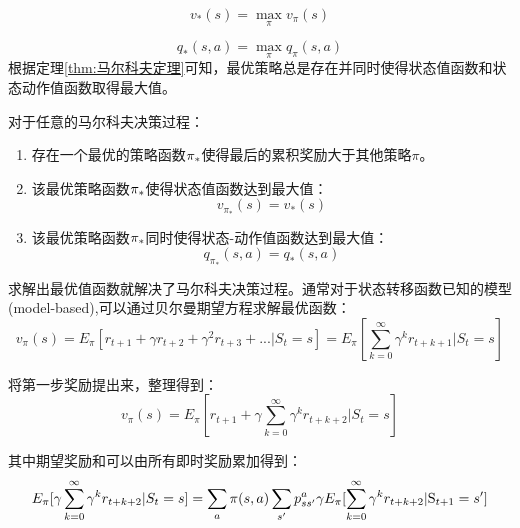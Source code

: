 \begin{equation}
\label{eq:6}
{v_*}(s) = \mathop {\max }\limits_\pi  {v_\pi }(s)
\end{equation}

\begin{equation}
\label{eq:7}
{q_*}(s,a) = \mathop {\max }\limits_\pi  {q_\pi }(s,a)
\end{equation}
根据定理\ref{thm:马尔科夫定理}可知，最优策略总是存在并同时使得状态值函数和状态动作值函数取得最大值。
\begin{thm}[马尔科夫定理]
\label{thm:马尔科夫定理}
对于任意的马尔科夫决策过程：
\begin{enumerate}
	\item 存在一个最优的策略函数${\pi _{\rm{*}}}$使得最后的累积奖励大于其他策略$ \pi$。
	\item 该最优策略函数${\pi _{\rm{*}}}$使得状态值函数达到最大值：
	\begin{equation}
	\label{eq:optimal}
	{v_{{\pi _*}}}(s) = {v_*}(s)
	\end{equation}
	\item 该最优策略函数${\pi _{\rm{*}}}$同时使得状态-动作值函数达到最大值：
	\begin{equation}
	\label{eq:optimal}
	{q_{{\pi _*}}}(s,a) = {q_*}(s,a)
	\end{equation}
	
\end{enumerate}
\end{thm}

求解出最优值函数就解决了马尔科夫决策过程。通常对于状态转移函数已知的模型(model-based),可以通过贝尔曼期望方程求解最优函数：
\begin{equation}
\label{eq:bell1}
{v_\pi }(s) = {E_\pi }[{r_{t + 1}} + \gamma {r_{t + 2}} + {\gamma ^2}{r_{t + 3}} + ...|{S_t} = s] = {E_\pi }[\sum\limits_{k = 0}^\infty  {{\gamma ^k}{r_{t + k + 1}}|{S_t}}  = s]
\end{equation}

将第一步奖励提出来，整理得到：
\begin{equation}
\label{eq:bell3}
{v_\pi }(s) = {E_\pi }[{r_{t + 1}} + \gamma \sum\limits_{k = 0}^\infty  {{\gamma ^k}{r_{t + k + 2}}|{S_t}}  = s]
\end{equation}

其中期望奖励和可以由所有即时奖励累加得到：
\begin{equation}
\label{eq:bell4}
{E_\pi }[\gamma \sum\limits_{k = 0}^\infty  {{\gamma ^k}{r_{t + k + 2}}|{S_t}}  = s] = \sum\limits_a {\pi (s,a)\sum\limits_{s'} {p_{ss'}^a} } \gamma {E_\pi }[\sum\limits_{k = 0}^\infty  {{\gamma ^k}{r_{t + k{\rm{ + }}2}}{\rm{|}}{{\rm{S}}_{t + 1}} = s'} ]
\end{equation}

